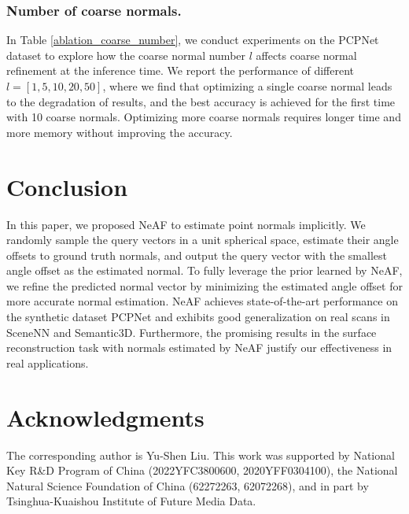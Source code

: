 \documentclass[letterpaper]{article} \usepackage{aaai23}  \usepackage{times}  \usepackage{helvet}  \usepackage{courier}  \usepackage[hyphens]{url}  \usepackage{graphicx} \urlstyle{rm} \def\UrlFont{\rm}  \usepackage{natbib}  \usepackage{caption} \frenchspacing  \setlength{\pdfpagewidth}{8.5in} \setlength{\pdfpageheight}{11in} \usepackage{algorithm}
\begin{document}
\subsubsection{Number of coarse normals.}
In Table \ref{ablation_coarse_number}, we conduct experiments on the PCPNet dataset to explore how the coarse normal number $l$ affects coarse normal refinement at the inference time. We report the performance of different $l=[1, 5, 10, 20, 50]$, where we find that optimizing a single coarse normal leads to the degradation of results, and the best accuracy is achieved for the first time with 10 coarse normals. Optimizing more coarse normals requires longer time and more memory without improving the accuracy.


\section{Conclusion}
In this paper, we proposed NeAF to estimate point normals implicitly. We randomly sample the query vectors in a unit spherical space, estimate their angle offsets to ground truth normals, and output the query vector with the smallest angle offset as the estimated normal. To fully leverage the prior learned by NeAF, we refine the predicted normal vector by minimizing the estimated angle offset for more accurate normal estimation. NeAF achieves state-of-the-art performance on the synthetic dataset PCPNet and exhibits good generalization on real scans in SceneNN and Semantic3D. Furthermore, the promising results in the surface reconstruction task with normals estimated by NeAF justify our effectiveness in real applications.

\section{Acknowledgments}
The corresponding author is Yu-Shen Liu. This work was supported by National Key R\&D Program of China (2022YFC3800600, 2020YFF0304100), the National Natural Science Foundation of China (62272263, 62072268), and in part by Tsinghua-Kuaishou Institute of Future Media Data.


\end{document}
